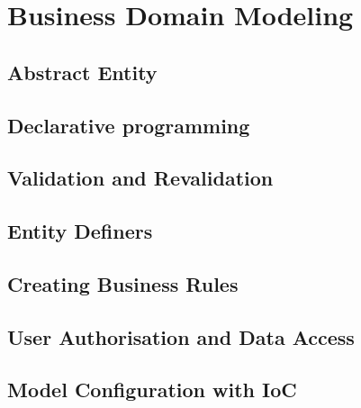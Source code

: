 \chapter{Business Domain Modeling}\label{ch:02}

\section{Abstract Entity}

\section{Declarative programming}

\section{Validation and Revalidation}

\section{Entity Definers}

\section{Creating Business Rules}

\section{User Authorisation and Data Access}

\section{Model Configuration with IoC}
  